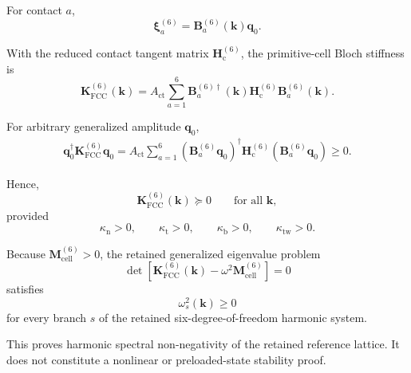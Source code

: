 For contact $a$,
\begin{equation}
    \boldsymbol{\xi}_a^{(6)} = \mathbf{B}_a^{(6)}(\mathbf{k})\mathbf{q}_0.
\end{equation}

With the reduced contact tangent matrix $\mathbf{H}_{\mathrm{c}}^{(6)}$, the primitive-cell Bloch stiffness is
\begin{equation}
    \boxed{
    \mathbf{K}_{\mathrm{FCC}}^{(6)}(\mathbf{k})
    =
    A_{\mathrm{ct}}
    \sum_{a=1}^{6}
    \mathbf{B}_a^{(6)\dagger}(\mathbf{k})
    \mathbf{H}_{\mathrm{c}}^{(6)}
    \mathbf{B}_a^{(6)}(\mathbf{k}).
    }
\end{equation}

For arbitrary generalized amplitude $\mathbf{q}_0$,
\begin{equation}
\begin{aligned}
    \mathbf{q}_0^{\dagger}\mathbf{K}_{\mathrm{FCC}}^{(6)}\mathbf{q}_0
    =
    A_{\mathrm{ct}}\sum_{a=1}^{6}
    \left(\mathbf{B}_a^{(6)}\mathbf{q}_0\right)^{\dagger}
    \mathbf{H}_{\mathrm{c}}^{(6)}
    \left(\mathbf{B}_a^{(6)}\mathbf{q}_0\right)
    \geq 0.
\end{aligned}
\end{equation}

Hence,
\begin{equation}
    \boxed{
    \mathbf{K}_{\mathrm{FCC}}^{(6)}(\mathbf{k})\succeq0
    \qquad
    \text{for all }\mathbf{k},
    }
\end{equation}
provided
\begin{equation}
    \kappa_{\mathrm{n}}>0, \qquad
    \kappa_{\mathrm{t}}>0, \qquad
    \kappa_{\mathrm{b}}>0, \qquad
    \kappa_{\mathrm{tw}}>0.
\end{equation}

Because $\mathbf{M}_{\mathrm{cell}}^{(6)}>0$, the retained generalized eigenvalue problem
\begin{equation}
    \det\!\left[
        \mathbf{K}_{\mathrm{FCC}}^{(6)}(\mathbf{k})
        -
        \omega^2\mathbf{M}_{\mathrm{cell}}^{(6)}
    \right]
    =
    0
\end{equation}
satisfies
\begin{equation}
    \omega_s^2(\mathbf{k})\geq0
\end{equation}
for every branch $s$ of the retained six-degree-of-freedom harmonic system.

This proves harmonic spectral non-negativity of the retained reference lattice. It does not constitute a nonlinear or preloaded-state stability proof.

